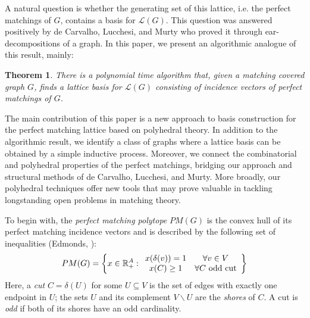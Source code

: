 \documentclass[11pt]{article}
\newcommand{\1}{\mathbf{1}}
\newcommand{\0}{\mathbf{0}}
\newcommand{\zL}{\mathcal L}
\newcommand{\R}{\mathbb{R}}
\newtheorem{theorem}{Theorem}[section]
\begin{document}
A natural question is whether the generating set of this lattice, i.e. the perfect matchings of $G$, contains a basis for $\zL(G)$. This question was answered positively by de Carvalho, Lucchesi, and Murty \cite{dimension} who proved it through ear-decompositions of a graph. In this paper, we present an algorithmic analogue of this result, mainly:
\begin{theorem}\label{thm:main}
    There is a polynomial time algorithm that, given a matching covered graph $G$, finds a lattice basis for $\zL(G)$ consisting of incidence vectors of perfect matchings of $G$.
\end{theorem}
The main contribution of this paper is a new approach to basis construction for the perfect matching lattice based on polyhedral theory. In addition to the algorithmic result, we identify a class of graphs where a lattice basis can be obtained by a simple inductive process. Moreover, we connect the combinatorial and polyhedral properties of the perfect matchings, bridging our approach and structural methods of de Carvalho, Lucchesi, and Murty. More broadly, our polyhedral techniques offer new tools that may prove valuable in tackling longstanding open problems in matching theory. %

To begin with, the \emph{perfect matching polytope} $PM(G)$ is the convex hull of its perfect matching incidence vectors and is described by the following set of inequalities (Edmonds, \cite{edmonds1965maximum}):
\begin{equation}\label{eq:pm-general}
    PM(G)=\left\{x\in \R^A_{+}: \begin{array}{cc}
    x(\delta(v))= 1 &  \forall v\in V\\
     x(C)\geq 1 &  \forall C \textmd{ odd cut}
\end{array}\right\}
\end{equation}
Here, a \emph{cut} $C = \delta(U)$ for some $U\subseteq V$ is the set of edges with exactly one endpoint in $U$; the sets $U$ and its complement $V\backslash U$ are the \emph{shores} of $C$. A cut is \emph{odd} if both of its shores have an odd cardinality. 
\end{document}
